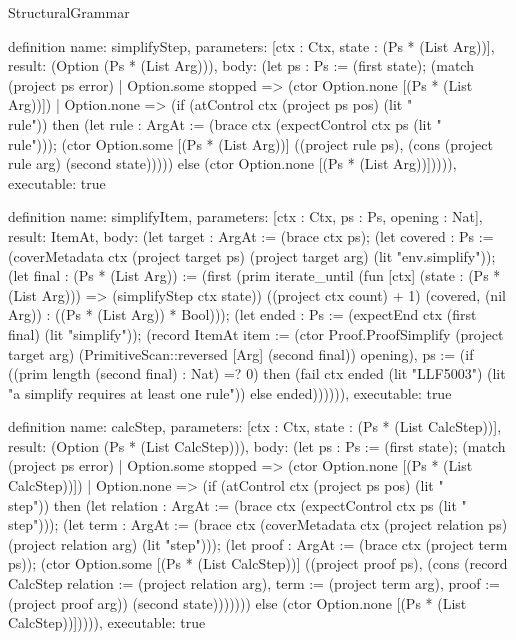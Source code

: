 \begin{lexlean}{StructuralGrammar}
\begin{semanticmodule}
{{definition{
  name: simplifyStep,
  parameters: [ctx : Ctx, state : (Ps * (List Arg))],
  result: (Option (Ps * (List Arg))),
  body: (let ps : Ps := (first state); (match (project ps error)
    | Option.some stopped => (ctor Option.none [(Ps * (List Arg))])
    | Option.none => (if (atControl ctx (project ps pos) (lit "\\rule")) then (let rule : ArgAt := (brace ctx (expectControl ctx ps (lit "\\rule"))); (ctor Option.some [(Ps * (List Arg))] ((project rule ps), (cons (project rule arg) (second state))))) else (ctor Option.none [(Ps * (List Arg))])))),
  executable: true
}

definition{
  name: simplifyItem,
  parameters: [ctx : Ctx, ps : Ps, opening : Nat],
  result: ItemAt,
  body: (let target : ArgAt := (brace ctx ps); (let covered : Ps := (coverMetadata ctx (project target ps) (project target arg) (lit "env.simplify")); (let final : (Ps * (List Arg)) := (first (prim iterate_until (fun [ctx] (state : (Ps * (List Arg))) => (simplifyStep ctx state)) ((project ctx count) + 1) (covered, (nil Arg)) : ((Ps * (List Arg)) * Bool))); (let ended : Ps := (expectEnd ctx (first final) (lit "simplify")); (record ItemAt {item := (ctor Proof.ProofSimplify (project target arg) (PrimitiveScan::reversed [Arg] (second final)) opening), ps := (if ((prim length (second final) : Nat) =? 0) then (fail ctx ended (lit "LLF5003") (lit "a simplify requires at least one rule")) else ended)}))))),
  executable: true
}

definition{
  name: calcStep,
  parameters: [ctx : Ctx, state : (Ps * (List CalcStep))],
  result: (Option (Ps * (List CalcStep))),
  body: (let ps : Ps := (first state); (match (project ps error)
    | Option.some stopped => (ctor Option.none [(Ps * (List CalcStep))])
    | Option.none => (if (atControl ctx (project ps pos) (lit "\\step")) then (let relation : ArgAt := (brace ctx (expectControl ctx ps (lit "\\step"))); (let term : ArgAt := (brace ctx (coverMetadata ctx (project relation ps) (project relation arg) (lit "step"))); (let proof : ArgAt := (brace ctx (project term ps)); (ctor Option.some [(Ps * (List CalcStep))] ((project proof ps), (cons (record CalcStep {relation := (project relation arg), term := (project term arg), proof := (project proof arg)}) (second state))))))) else (ctor Option.none [(Ps * (List CalcStep))])))),
  executable: true
}

}}
\end{semanticmodule}
\end{lexlean}
